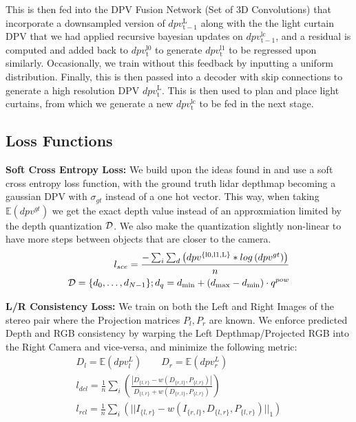This is then fed into the DPV Fusion Network (Set of 3D Convolutions) that incorporate a downsampled version of $dpv_{\mathrm{t-1}}^{\mathrm{L}}$ along with the the light curtain DPV that we had applied recursive bayesian updates on $dpv_{\mathrm{t-1}}^{\mathrm{lc}}$, and a residual is computed and added back to $dpv_{\mathrm{t}}^{\mathrm{l0}}$ to generate $dpv_{\mathrm{t}}^{\mathrm{l1}}$ to be regressed upon similarly. Occasionally, we train without this feedback by inputting a uniform distribution. Finally, this is then passed into a decoder with skip connections to generate a high resolution DPV $dpv_{\mathrm{t}}^{\mathrm{L}}$. This is then used to plan and place light curtains, from which we generate a new $dpv_{\mathrm{t}}^{\mathrm{lc}}$ to be fed in the next stage.

\subsection{Loss Functions}

\textbf{Soft Cross Entropy Loss:} We build upon the ideas found in \cite{Yang-2019-118007} and use a soft cross entropy loss function, with the ground truth lidar depthmap becoming a gaussian DPV with $\sigma_{gt}$ instead of a one hot vector. This way, when taking $\mathbb{E}\left(dpv^{gt}\right)$ we get the exact depth value instead of an approxmiation limited by the depth quantization $\mathcal{D}$. We also make the quantization slightly non-linear to have more steps between objects that are closer to the camera.
\small
\begin{align}
    l_{sce}=\frac{-\sum_{i}\sum_{d}\left(dpv^{\mathrm{\{l0,l1,L\}}}*log\left(dpv^{gt}\right)\right)}{n} \\
    \mathcal{D}=\{d_{0},\dots,d_{N-1}\};d_{q}=d_{\text{min}}+(d_{\text{max}}-d_{\text{min}})\cdot q^{pow}
   \label{eq:seloss}
\end{align}
\normalsize

\textbf{L/R Consistency Loss:} We train on both the Left and Right Images of the stereo pair where the Projection matrices $P_{l}, P_{r}$ are known. We enforce predicted Depth and RGB consistency by warping the Left Depthmap/Projected RGB into the Right Camera and vice-versa, and minimize the following metric:
\small
\begin{align}
    D_{l}=\mathbb{E}\left(dpv_{l}^{L}\right)\qquad D_{r}=\mathbb{E}\left(dpv_{r}^{L}\right) \\
    l_{dcl}=\frac{1}{n}\sum_{i}\left(\frac{\left|D_{\{l,r\}}-w\left(D_{\{r,l\}},P_{\{l,r\}}\right)\right|}{D_{\{l,r\}}+w\left(D_{\{r,l\}},P_{\{l,r\}}\right)}\right) \\
    l_{rcl}=\frac{1}{n}\sum_{i}\left(||I_{\{l,r\}}-w\left(I_{\{r,l\}},D_{\{l,r\}},P_{\{l,r\}}\right)||_{1}\right)
   \label{eq:lrcons} 
\end{align}
\normalsize

